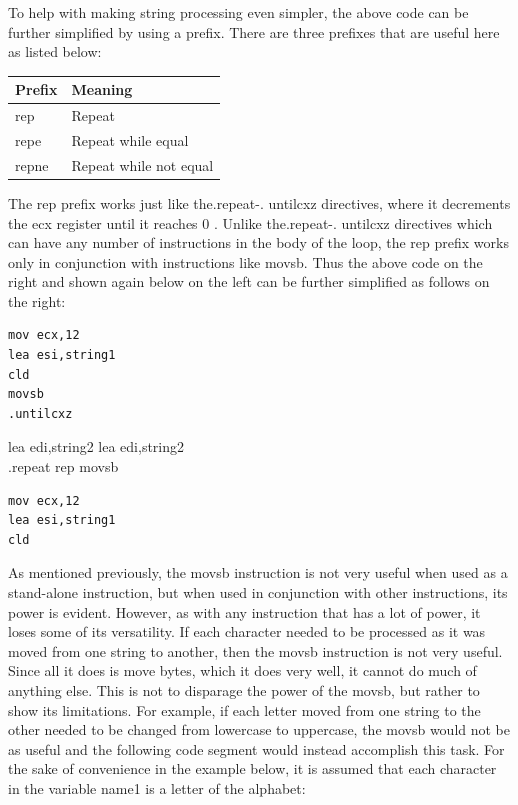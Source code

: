 \documentclass[10pt]{book}
\begin{document}
To help with making string processing even simpler, the above code can be further simplified by using a prefix. There are three prefixes that are useful here as listed below:

\begin{center}
\begin{tabular}{|l|l|}
\hline
Prefix & Meaning \\
\hline
rep & Repeat \\
\hline
repe & Repeat while equal \\
\hline
repne & Repeat while not equal \\
\hline
\end{tabular}
\end{center}

The rep prefix works just like the.repeat-. untilcxz directives, where it decrements the ecx register until it reaches 0 . Unlike the.repeat-. untilcxz directives which can have any number of instructions in the body of the loop, the rep prefix works only in conjunction with instructions like movsb. Thus the above code on the right and shown again below on the left can be further simplified as follows on the right:

\begin{verbatim}
mov ecx,12
lea esi,string1
cld
movsb
.untilcxz
\end{verbatim}

lea edi,string2 lea edi,string2\\
.repeat rep movsb

\begin{verbatim}
mov ecx,12
lea esi,string1
cld
\end{verbatim}

As mentioned previously, the movsb instruction is not very useful when used as a stand-alone instruction, but when used in conjunction with other instructions, its power is evident. However, as with any instruction that has a lot of power, it loses some of its versatility. If each character needed to be processed as it was moved from one string to another, then the movsb instruction is not very useful. Since all it does is move bytes, which it does very well, it cannot do much of anything else. This is not to disparage the power of the movsb, but rather to show its limitations. For example, if each letter moved from one string to the other needed to be changed from lowercase to uppercase, the movsb would not be as useful and the following code segment would instead accomplish this task. For the sake of convenience in the example below, it is assumed that each character in the variable name1 is a letter of the alphabet:
\end{document}
